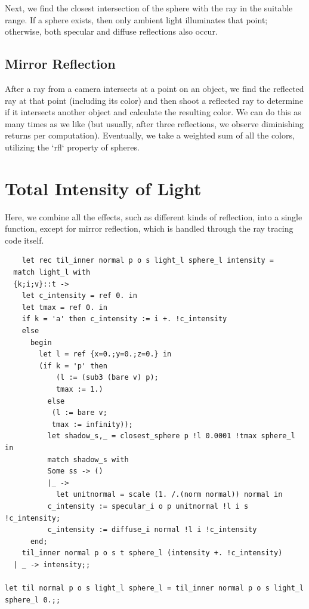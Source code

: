 \documentclass[conference]{IEEEtran}
\begin{document}
Next, we find the closest intersection of the sphere with the ray in the suitable range. If a sphere exists, then only ambient light illuminates that point; otherwise, both specular and diffuse reflections also occur.

\subsection{Mirror Reflection}

After a ray from a camera intersects at a point on an object, we find the reflected ray at that point (including its color) and then shoot a reflected ray to determine if it intersects another object and calculate the resulting color. We can do this as many times as we like (but usually, after three reflections, we observe diminishing returns per computation). Eventually, we take a weighted sum of all the colors, utilizing the `rfl` property of spheres.

\section{Total Intensity of Light}

Here, we combine all the effects, such as different kinds of reflection, into a single function, except for mirror reflection, which is handled through the ray tracing code itself.


\begin{lstlisting}
    let rec til_inner normal p o s light_l sphere_l intensity = 
  match light_l with 
  {k;i;v}::t -> 
    let c_intensity = ref 0. in
    let tmax = ref 0. in 
    if k = 'a' then c_intensity := i +. !c_intensity 
    else 
      begin
        let l = ref {x=0.;y=0.;z=0.} in
        (if k = 'p' then
            (l := (sub3 (bare v) p); 
            tmax := 1.)
          else  
           (l := bare v;
           tmax := infinity));
          let shadow_s,_ = closest_sphere p !l 0.0001 !tmax sphere_l in 
          match shadow_s with 
          Some ss -> ()
          |_ -> 
            let unitnormal = scale (1. /.(norm normal)) normal in 
          c_intensity := specular_i o p unitnormal !l i s !c_intensity;
          c_intensity := diffuse_i normal !l i !c_intensity
      end;
    til_inner normal p o s t sphere_l (intensity +. !c_intensity)
  | _ -> intensity;;

let til normal p o s light_l sphere_l = til_inner normal p o s light_l sphere_l 0.;;
\end{lstlisting} 
\end{document}
